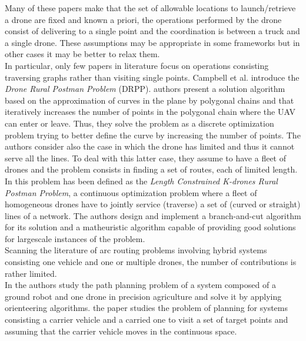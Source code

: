 \noindent
Many of these papers make  that the set of allowable locations to launch/retrieve a drone are fixed and known a priori, the operations performed by the drone consist of delivering to a single point and the coordination is between a truck and a single drone. These assumptions may be appropriate in some frameworks\RE{,} but in other cases it may be better to relax them.\\
\noindent
In particular, only  few papers in  literature focus on  operations consisting  traversing graphs rather than visiting single points. Campbell et al. 
\cite{art:Campbell2018} introduce the \textit{Drone Rural Postman Problem} (DRPP).  authors present a solution algorithm based on the approximation of curves in the plane by polygonal chains and that iteratively increases the number of points in the polygonal chain where the UAV can enter or leave. Thus, they solve the problem as a discrete optimization problem trying to better define the curve by increasing the number of points. The authors consider also the case in which the drone has limited  and thus it cannot serve all the lines. To deal with this latter case, they assume to have a fleet of drones and the problem consists in finding a set of routes, each of limited length.\\
In \cite{art:CAMPBELL202160}  this problem has been defined as the \textit{Length Constrained K-drones Rural Postman Problem}, a continuous optimization problem where a fleet of homogeneous drones have to jointly service (traverse) a set of (curved or straight) lines of a network. The authors design and implement a branch-and-cut algorithm for its solution and a matheuristic algorithm capable of providing good solutions for large\RE{-}scale instances of the problem.\\
Scanning the literature of arc routing problems involving hybrid systems consisting  one vehicle and one or multiple drones, the number of contributions is rather limited.\\
In \cite{art:Tokekar2016} the authors study the path planning problem of a system composed of a ground robot and one drone in precision agriculture and solve it by applying orienteering algorithms.  the paper \cite{art:Garone2010} studies the problem of  planning for systems consisting  a carrier vehicle and a carried one to visit a set of target points and assuming that the carrier vehicle moves in the continuous space.\\
